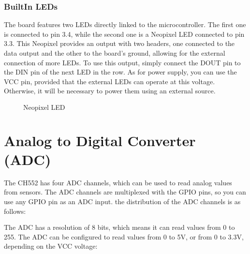 \documentclass[letterpaper,10pt,english]{sphinxmanual}
\begin{document}
\subsection{Built\sphinxhyphen{}In LEDs}
\label{\detokenize{generalboardcontrol:built-in-leds}}
\sphinxAtStartPar
The board features two LEDs directly linked to the microcontroller. The first one is connected to pin 3.4, while the second one is a Neopixel LED connected to pin 3.3. This Neopixel provides an output with two headers, one connected to the data output and the other to the board’s ground, allowing for the external connection of more LEDs. To use this output, simply connect the DOUT pin to the DIN pin of the next LED in the row. As for power supply, you can use the VCC pin, provided that the external LEDs can operate at this voltage. Otherwise, it will be necessary to power them using an external source.

\begin{figure}[htbp]
\centering
\capstart

\noindent{}
\caption{Neopixel LED}\label{\detokenize{generalboardcontrol:id4}}\label{\detokenize{generalboardcontrol:neopixel}}\end{figure}

\sphinxstepscope


\chapter{Analog to Digital Converter (ADC)}
\label{\detokenize{adc:analog-to-digital-converter-adc}}\label{\detokenize{adc::doc}}
\sphinxAtStartPar
The CH552 has four ADC channels, which can be used to read analog values from sensors. The ADC channels are multiplexed with the GPIO pins, so you can use any GPIO pin as an ADC input.
the distribution of the ADC channels is as follows:

\begin{sphinxVerbatim}[commandchars=\\\{\}]
  
  
  
  
\end{sphinxVerbatim}

\sphinxAtStartPar
The ADC has a resolution of 8 bits, which means it can read values from 0 to 255. The ADC can be configured to read values from 0 to 5V, or from 0 to 3.3V, depending on the VCC voltage:
\end{document}
